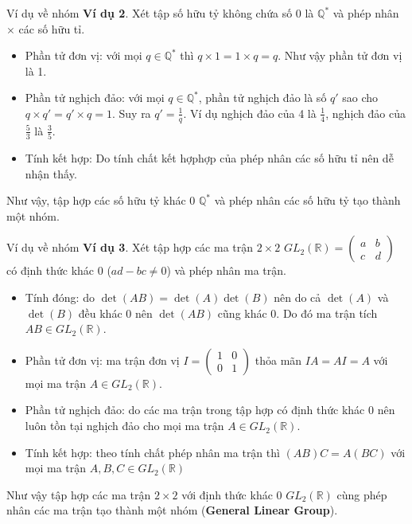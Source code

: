 \begin{frame}{Ví dụ về nhóm}
    \textbf{Ví dụ 2}. Xét tập số hữu tỷ không chứa số 0 là $\mathbb{Q}^*$ và phép nhân $\times$ các số hữu tỉ.
    
    \begin{itemize}
        \item Phần tử đơn vị: với mọi $q \in \mathbb{Q}^*$ thì $q \times 1 = 1 \times q = q$. Như vậy phần tử đơn vị là 1.
        \item Phần tử nghịch đảo: với mọi $q \in \mathbb{Q}^*$, phần tử nghịch đảo là số $q'$ sao cho $q \times q' = q' \times q = 1$. Suy ra $q' = \frac{1}{q}$. Ví dụ nghịch đảo của 4 là $\frac{1}{4}$, nghịch đảo của $\frac{5}{3}$ là $\frac{3}{5}$.
        \item Tính kết hợp: Do tính chất kết hợphợp của phép nhân các số hữu tỉ nên dễ nhận thấy.
    \end{itemize}

    Như vậy, tập hợp các số hữu tỷ khác 0 $\mathbb{Q}^*$ và phép nhân các số hữu tỷ tạo thành một nhóm.
\end{frame}

\begin{frame}{Ví dụ về nhóm}
    \textbf{Ví dụ 3}. Xét tập hợp các ma trận $2\times 2$ $GL_2(\mathbb{R}) = \begin{pmatrix}a & b \\ c & d\end{pmatrix}$ có định thức khác 0 ($ad - bc \neq 0$) và phép nhân ma trận.
    \begin{itemize}
        \item Tính đóng: do $\det(AB) = \det(A) \det(B)$ nên do cả $\det(A)$ và $\det(B)$ đều khác 0 nên $\det(AB)$ cũng khác 0. Do đó ma trận tích $AB \in GL_2(\mathbb{R})$.
        \item Phần tử đơn vị: ma trận đơn vị $I = \begin{pmatrix}1 & 0 \\ 0 & 1\end{pmatrix}$ thỏa mãn $I A = A I = A$ với mọi ma trận $A \in GL_2(\mathbb{R})$.
        \item Phần tử nghịch đảo: do các ma trận trong tập hợp có định thức khác 0 nên luôn tồn tại nghịch đảo cho mọi ma trận $A \in GL_2(\mathbb{R})$.
        \item Tính kết hợp: theo tính chất phép nhân ma trận thì $(AB)C = A(BC)$ với mọi ma trận $A, B, C \in GL_2(\mathbb{R})$
    \end{itemize}
    
    Như vậy tập hợp các ma trận $2 \times 2$ với định thức khác 0 $GL_2(\mathbb{R})$ cùng phép nhân các ma trận tạo thành một nhóm (\textbf{General Linear Group}).
\end{frame}

